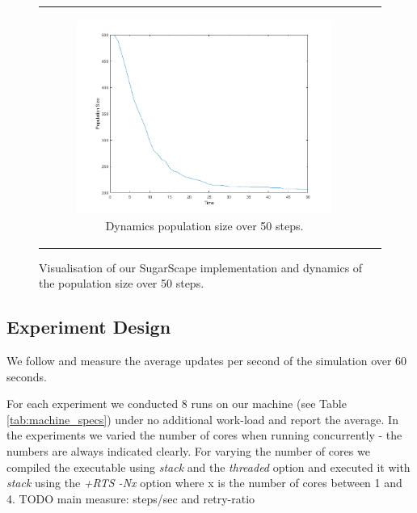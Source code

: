 \begin{figure}
\begin{center}
\begin{tabular}{c c}
		\begin{subfigure}[b]{0.5\textwidth}
			\centering
			\includegraphics[width=1\textwidth, angle=0]{./fig/sugarscape/vis/sugarscape_t60_dynamics.png}
			\caption{Dynamics population size over 50 steps.}
			\label{fig:vis_sugarscape_t50_dynamics}
		\end{subfigure}
	\end{tabular}
	
	\caption{Visualisation of our SugarScape implementation and dynamics of the population size over 50 steps.}
	\label{fig:vis_sugarscape}
\end{center}
\end{figure}

\subsection{Experiment Design}
We follow \cite{lysenko_framework_2008} and measure the average updates per second of the simulation over 60 seconds.

For each experiment we conducted 8 runs on our machine (see Table \ref{tab:machine_specs}) under no additional work-load and report the average. In the experiments we varied the number of cores when running concurrently - the numbers are always indicated clearly. For varying the number of cores we compiled the executable using \textit{stack} and the \textit{threaded} option and executed it with \textit{stack} using the \textit{+RTS -Nx} option where x is the number of cores between 1 and 4. TODO main measure: steps/sec and retry-ratio

